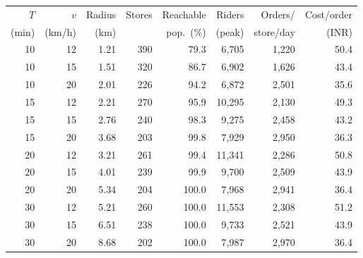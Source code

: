 \begin{tabular}{rrrrrrrr}
\toprule
$T$ & $v$ & Radius & Stores & Reachable & Riders & Orders/ & Cost/order \\
(min) & (km/h) & (km) & & pop.\ (\%) & (peak) & store/day & (INR) \\
\midrule
10 & 12 & 1.21 & 390 & 79.3 & 6,705 & 1,220 & 50.4 \\
10 & 15 & 1.51 & 320 & 86.7 & 6,902 & 1,626 & 43.4 \\
10 & 20 & 2.01 & 226 & 94.2 & 6,872 & 2,501 & 35.6 \\
15 & 12 & 2.21 & 270 & 95.9 & 10,295 & 2,130 & 49.3 \\
15 & 15 & 2.76 & 240 & 98.3 & 9,275 & 2,458 & 43.2 \\
15 & 20 & 3.68 & 203 & 99.8 & 7,929 & 2,950 & 36.3 \\
20 & 12 & 3.21 & 261 & 99.4 & 11,341 & 2,286 & 50.8 \\
20 & 15 & 4.01 & 239 & 99.9 & 9,700 & 2,509 & 43.9 \\
20 & 20 & 5.34 & 204 & 100.0 & 7,968 & 2,941 & 36.4 \\
30 & 12 & 5.21 & 260 & 100.0 & 11,553 & 2,308 & 51.2 \\
30 & 15 & 6.51 & 238 & 100.0 & 9,733 & 2,521 & 43.9 \\
30 & 20 & 8.68 & 202 & 100.0 & 7,987 & 2,970 & 36.4 \\
\bottomrule
\end{tabular}
